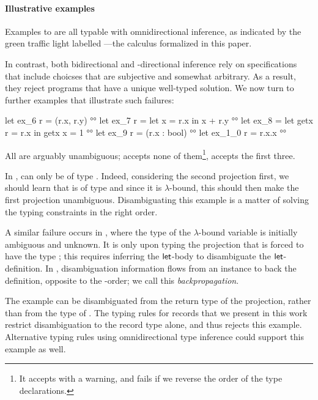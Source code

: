 \documentclass[acmsmall,screen,nonacm,review]{acmart}
\begin{document}
\paragraph{Illustrative examples}

Examples  to  are all typable with omnidirectional
inference, as indicated by the green traffic light labelled \OML---the
calculus formalized in this paper.

%
In contrast, both bidirectional and \Geninst-directional inference
rely on specifications that include choicses that are subjective
and somewhat arbitrary. As a result, they reject programs
that have a unique well-typed solution. We now turn to
further examples that illustrate such failures:
%
\locallabelreset
%
\begin{program}[input]
let ex_6 r = (r.x, r.y)                          °°
let ex_7 r = let x = r.x in x + r.y              °°
let ex_8 = let getx r = r.x in getx {x = 1}      °°
let ex_9 r = (r.x : bool)                        °°
let ex_1_0 r = r.x.x                              °°
\end{program}
All are arguably unambiguous; \OCaml accepts none of them\footnote{It
accepts  with a warning, and fails if we reverse the order of the
type declarations. }, \OML accepts the first three.

In ,  can only be of type . Indeed,
considering the second projection first, we should learn that
 is of type  and since it is $\lambda$-bound, this
should then make the first projection unambiguous. Disambiguating this example is a matter
of solving the typing constraints in the right order.

A similar failure occurs in , where the type of the
$\lambda$-bound variable  is initially ambiguous and
unknown. It is only upon typing the projection  that
 is forced to have the type ; this requires
inferring the $\mathopen{}\mathrel{\mathsf{let}}$-body to disambiguate the $\mathopen{}\mathrel{\mathsf{let}}$-definition.
%
In , disambiguation information flows from an instance to
back the definition, opposite to the \Geninst-order; we call this
\emph{backpropagation}.

The example  can be disambiguated from the return type of
the projection, rather than from the type of . The typing rules for
records that we present in this work restrict disambiguation to the
record type alone, and thus rejects this example. Alternative typing rules
using omnidirectional type inference could support this example as
well.
\end{document}
